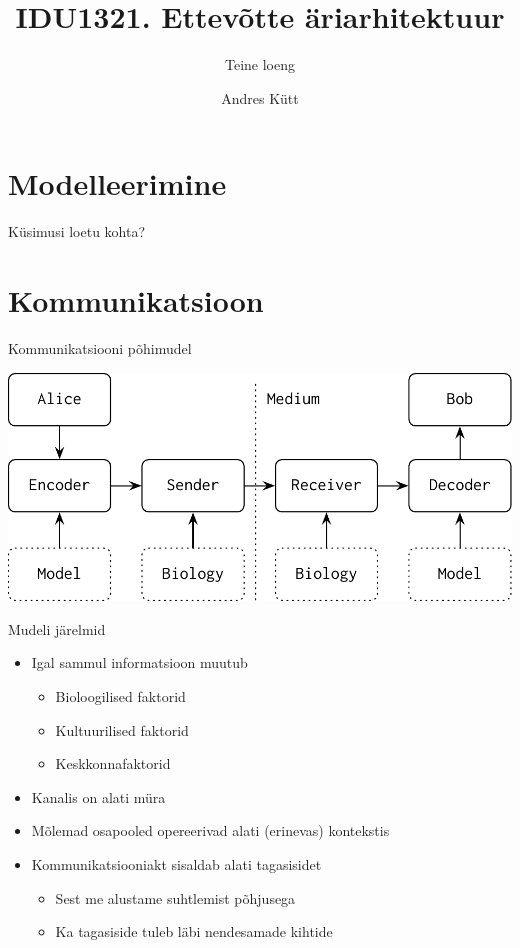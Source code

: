 \documentclass{beamer}
\title{IDU1321. Ettevõtte äriarhitektuur}
\subtitle{Teine loeng}
\author{Andres Kütt}
\institute{Cybernetica, arhitekt}
\begin{document}
\begin{frame}
\titlepage
\end{frame}

\section{Modelleerimine}

\begin{frame}[standout]
Küsimusi loetu kohta?
\end{frame}

\section{Kommunikatsioon}
\begin{frame}{Kommunikatsiooni põhimudel}
\begin{center}
	\includegraphics[width=.8\textwidth]{communication_model.pdf}
	\end{center}
\end{frame}

\begin{frame}{Mudeli järelmid}
	\begin{itemize}
		\item Igal sammul informatsioon muutub
		\begin{itemize}
			\item Bioloogilised faktorid
			\item Kultuurilised faktorid
			\item Keskkonnafaktorid
		\end{itemize}
		\item Kanalis on alati müra
		\item Mõlemad osapooled opereerivad alati (erinevas) kontekstis
		\item Kommunikatsiooniakt sisaldab alati tagasisidet
		\begin{itemize}
			\item Sest me alustame suhtlemist põhjusega
			\item Ka tagasiside tuleb läbi nendesamade kihtide
		\end{itemize}
	\end{itemize}
\end{frame}
\end{document}

